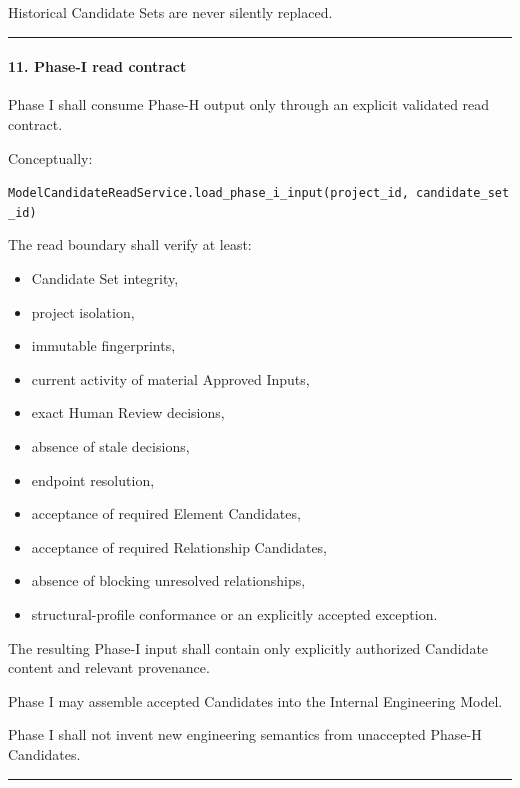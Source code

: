 Historical Candidate Sets are never silently replaced.

\begin{center}\rule{0.5\linewidth}{0.5pt}\end{center}

\hypertarget{11-phase-i-read-contract}{%
\paragraph{11. Phase-I read contract}\label{11-phase-i-read-contract}}

Phase I shall consume Phase-H output only through an explicit validated read contract.

Conceptually:

\texttt{ModelCandidateReadService.load\_phase\_i\_input(project\_id,\ candidate\_set\_id)}

The read boundary shall verify at least:

\begin{itemize}
\tightlist
\item
  Candidate Set integrity,
\item
  project isolation,
\item
  immutable fingerprints,
\item
  current activity of material Approved Inputs,
\item
  exact Human Review decisions,
\item
  absence of stale decisions,
\item
  endpoint resolution,
\item
  acceptance of required Element Candidates,
\item
  acceptance of required Relationship Candidates,
\item
  absence of blocking unresolved relationships,
\item
  structural-profile conformance or an explicitly accepted exception.
\end{itemize}

The resulting Phase-I input shall contain only explicitly authorized Candidate content and relevant provenance.

Phase I may assemble accepted Candidates into the Internal Engineering Model.

Phase I shall not invent new engineering semantics from unaccepted Phase-H Candidates.

\begin{center}\rule{0.5\linewidth}{0.5pt}\end{center}

